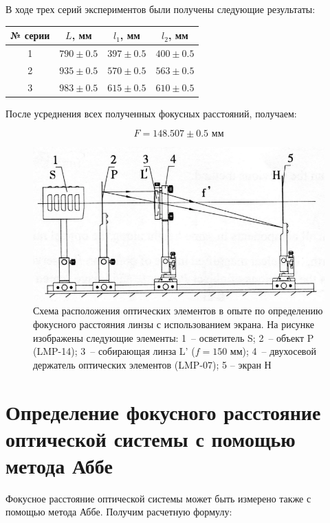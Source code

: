 \documentclass[a4paper, 12pt]{article}
\begin{document}
В ходе трех серий экспериментов были получены следующие результаты:

\begin{center}
	\begin{tabular}{|c|c|c|c|}
		\hline
		№ серии & $L$, мм & $l_1$, мм & $l_2$, мм \\
		\hline
		1 & $790 \pm 0.5$ & $397 \pm 0.5$ & $400 \pm 0.5$ \\
		\hline
		2 & $935 \pm 0.5$ & $570 \pm 0.5$ & $563 \pm 0.5$ \\
		\hline
		3 & $983 \pm 0.5$ & $615 \pm 0.5$ & $610 \pm 0.5$ \\
		\hline
	\end{tabular}
\end{center}

После усреднения всех полученных фокусных расстояний, получаем: %

\begin{equation*}
	\boxed{
		F = 148.507 \pm 0.5 \text{ мм}}
\end{equation*}

\begin{figure}[H]
	\centering
	\includegraphics[width=0.7\linewidth]{scheme_2}
	\caption{Схема расположения оптических элементов в опыте по определению фокусного расстояния линзы с использованием экрана. На рисунке изображены следующие элементы: 1~-- осветитель S; 2~-- объект P (LMP-14); 3~-- собирающая линза L' ($f=150$ мм); 4~-- двухосевой держатель оптических элементов (LMP-07); 5 – экран Н}
	\label{fig:1_2}
\end{figure}

\section{Определение фокусного расстояние оптической системы с помощью метода Аббе}

Фокусное расстояние оптической системы может быть измерено также с помощью метода Аббе. Получим расчетную формулу:
\end{document}

